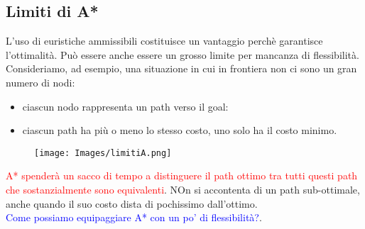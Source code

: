 \documentclass{article}
\begin{document}
\subsection{Limiti di A*}
L'uso di euristiche ammissibili costituisce un vantaggio perchè garantisce l'ottimalità. Può essere anche essere un grosso limite per mancanza di flessibilità. 
\\ Consideriamo, ad esempio, una situazione in cui in frontiera non ci sono un gran numero di nodi:
\begin{itemize}
    \item ciascun nodo rappresenta un path verso il goal:
    \item ciascun path ha più o meno lo stesso costo, uno solo ha il costo minimo.
\end{itemize}
\begin{figure}[H]
    \centering
    \texttt{[image: Images/limitiA.png]}
\end{figure}
\textcolor{red}{A* spenderà un sacco di tempo a distinguere il path ottimo tra tutti questi path che sostanzialmente sono equivalenti}. NOn si accontenta di un path sub-ottimale, anche quando il suo
costo dista di pochissimo dall'ottimo.
\\ \textcolor{blue}{Come possiamo equipaggiare A* con un po' di flessibilità?}.
\end{document}
